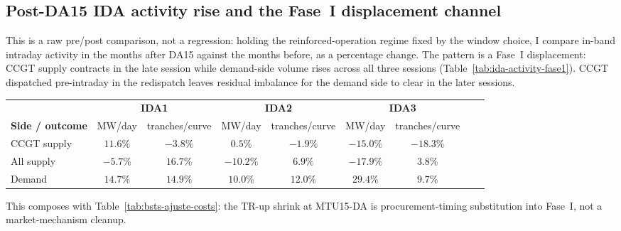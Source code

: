 \documentclass[11pt,a4paper]{article}
\theoremstyle{definition}
\theoremstyle{remark}
\theoremstyle{plain}
\begin{document}
\subsection{Post-DA15 IDA activity rise and the Fase~I displacement channel}\label{sec:5-ida-activity-fase1}

This is a raw pre/post comparison, not a regression: holding the reinforced-operation regime fixed by the window choice, I compare in-band intraday activity in the months after DA15 against the months before, as a percentage change. The pattern is a Fase~I displacement: CCGT supply contracts in the late session while demand-side volume rises across all three sessions (Table~\ref{tab:ida-activity-fase1}). CCGT dispatched pre-intraday in the redispatch leaves residual imbalance for the demand side to clear in the later sessions.

\begin{center}
\footnotesize
\setlength{\tabcolsep}{5pt}
\begin{tabular}{l c c c c c c c c}
\toprule
            & \multicolumn{2}{c}{\textbf{IDA1}} & \multicolumn{2}{c}{\textbf{IDA2}} & \multicolumn{2}{c}{\textbf{IDA3}} \\
\cmidrule(lr){2-3} \cmidrule(lr){4-5} \cmidrule(lr){6-7}
\textbf{Side / outcome}        & MW/day & tranches/curve & MW/day & tranches/curve & MW/day & tranches/curve \\
\midrule
CCGT supply        & $11.6\%$ & $-3.8\%$ & $0.5\%$ & $-1.9\%$ & $\mathbf{-15.0\%}$ & $-18.3\%$ \\
All supply         & $-5.7\%$  & $16.7\%$ & $-10.2\%$ & $6.9\%$ & $-17.9\%$ & $3.8\%$ \\
Demand             & $\mathbf{14.7\%}$ & $14.9\%$ & $\mathbf{10.0\%}$ & $12.0\%$ & $\mathbf{29.4\%}$ & $9.7\%$ \\
\bottomrule
\end{tabular}
\label{tab:ida-activity-fase1}
\end{center}

This composes with Table~\ref{tab:bsts-ajuste-costs}: the TR-up shrink at MTU15-DA is procurement-timing substitution into Fase~I, not a market-mechanism cleanup.
\end{document}
